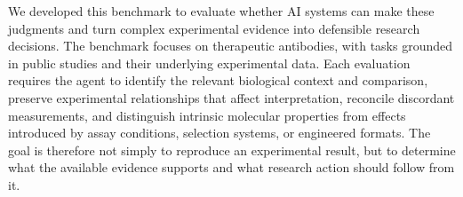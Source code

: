 \documentclass[10pt,letterpaper]{article}
\begin{document}
{\begin{minipage}[t]{0.47\textwidth}
\TwoColParaBreak
We developed this benchmark to evaluate whether AI systems can make these judgments and turn complex experimental evidence into defensible research decisions. The benchmark focuses on therapeutic antibodies, with tasks grounded in public studies and their underlying experimental data. Each evaluation requires the agent to identify the relevant biological context and comparison, preserve experimental relationships that affect interpretation, reconcile discordant measurements, and distinguish intrinsic molecular properties from effects introduced by assay conditions, selection systems, or engineered formats. The goal is therefore not simply to reproduce an experimental result, but to determine what the available evidence supports and what research action should follow from it.


\end{minipage}\hfill
\begin{minipage}[t]{0.47\textwidth}
\setlength{\parskip}{0pt}
\setlength{\parindent}{0pt}


\end{minipage}}
\end{document}

